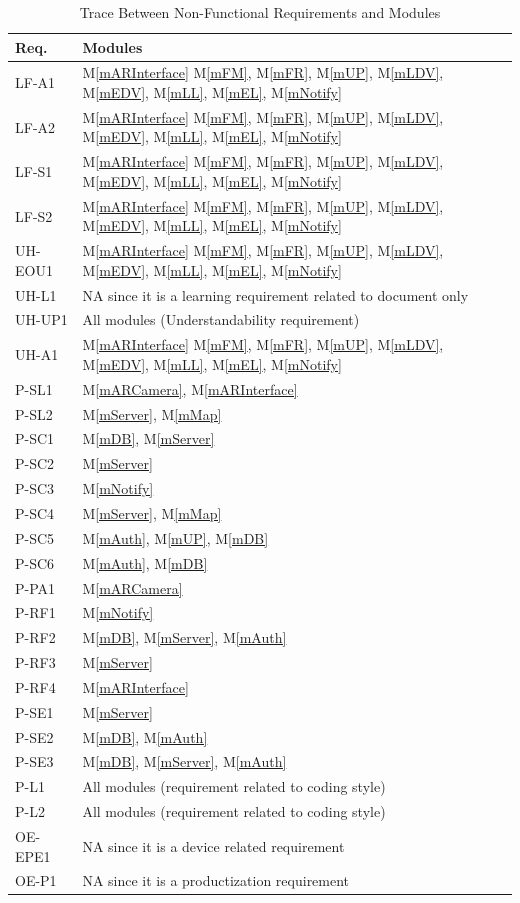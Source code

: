 \documentclass[12pt, titlepage]{article}
\newcommand{\mref}[1]{M\ref{#1}}
\begin{document}
\begin{table}[H]
\centering
\begin{tabular}{p{} p{}}
\toprule
\textbf{Req.} & \textbf{Modules}\\
\midrule
LF-A1 & \mref{mARInterface} \mref{mFM}, \mref{mFR}, \mref{mUP}, \mref{mLDV}, \mref{mEDV}, \mref{mLL}, \mref{mEL}, \mref{mNotify}\\
LF-A2 & \mref{mARInterface} \mref{mFM}, \mref{mFR}, \mref{mUP}, \mref{mLDV}, \mref{mEDV}, \mref{mLL}, \mref{mEL}, \mref{mNotify}\\
LF-S1 & \mref{mARInterface} \mref{mFM}, \mref{mFR}, \mref{mUP}, \mref{mLDV}, \mref{mEDV}, \mref{mLL}, \mref{mEL}, \mref{mNotify}\\
LF-S2 & \mref{mARInterface} \mref{mFM}, \mref{mFR}, \mref{mUP}, \mref{mLDV}, \mref{mEDV}, \mref{mLL}, \mref{mEL}, \mref{mNotify}\\
UH-EOU1 & \mref{mARInterface} \mref{mFM}, \mref{mFR}, \mref{mUP}, \mref{mLDV}, \mref{mEDV}, \mref{mLL}, \mref{mEL}, \mref{mNotify}\\
UH-L1 & NA since it is a learning requirement related to document only\\
UH-UP1 & All modules (Understandability requirement)\\
UH-A1 & \mref{mARInterface} \mref{mFM}, \mref{mFR}, \mref{mUP}, \mref{mLDV}, \mref{mEDV}, \mref{mLL}, \mref{mEL}, \mref{mNotify}\\
P-SL1 & \mref{mARCamera}, \mref{mARInterface}\\
P-SL2 & \mref{mServer}, \mref{mMap}\\
P-SC1 & \mref{mDB}, \mref{mServer}\\
P-SC2 & \mref{mServer}\\
P-SC3 & \mref{mNotify}\\
P-SC4 & \mref{mServer}, \mref{mMap}\\
P-SC5 & \mref{mAuth}, \mref{mUP}, \mref{mDB}\\
P-SC6 & \mref{mAuth}, \mref{mDB}\\
P-PA1 & \mref{mARCamera}\\
P-RF1 & \mref{mNotify}\\
P-RF2 & \mref{mDB}, \mref{mServer}, \mref{mAuth}\\
P-RF3 & \mref{mServer}\\
P-RF4 & \mref{mARInterface}\\
P-SE1 & \mref{mServer}\\
P-SE2 & \mref{mDB}, \mref{mAuth}\\
P-SE3 & \mref{mDB}, \mref{mServer}, \mref{mAuth}\\
P-L1 & All modules (requirement related to coding style)\\
P-L2 & All modules (requirement related to coding style)\\
OE-EPE1 & NA since it is a device related requirement\\
OE-P1 & NA since it is a productization requirement\\
\bottomrule
\end{tabular}
\caption{Trace Between Non-Functional Requirements and Modules}
\label{TblNFRT}
\end{table}
\end{document}
